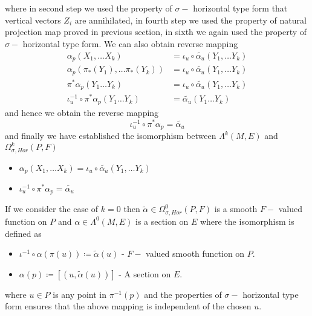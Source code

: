 \documentclass[12pt]{article}
\begin{document}
where in second step we used the property of $\sigma-$ horizontal type form that vertical vectors $Z_{i}$ are annihilated, in fourth step we used the property of natural projection map proved in previous section, in sixth we again used the property of $\sigma-$ horizontal type form. We can also obtain reverse mapping
\begin{align*}
    \alpha_{p}(X_{1}, \dots X_{k}) &=  \iota_{u}\circ\tilde{\alpha_{u}}(Y_{1}, \dots Y_{k}) \\
   \alpha_{p}(\pi_{\ast}(Y_{1}), \dots \pi_{\ast}(Y_{k}))  &= \iota_{u}\circ\tilde{\alpha_{u}}(Y_{1}, \dots Y_{k}) \\
      \pi^{\ast}\alpha_{p}(Y_{1}\dots Y_{k}) &= \iota_{u}\circ\tilde{\alpha_{u}}(Y_{1}, \dots Y_{k}) \\
      \iota_{u}^{-1}\circ\pi^{\ast}\alpha_{p}(Y_{1}\dots Y_{k}) &= \tilde{\alpha_{u}}(Y_{1}\dots Y_{k})
\end{align*} and hence we obtain the reverse mapping
\begin{equation*}
    \iota_{u}^{-1}\circ\pi^{\ast}\alpha_{p} = \tilde{\alpha_{u}}
\end{equation*} and finally we have established the isomorphism between $\Lambda^{k}(M, E)$ and $\Omega^{k}_{\sigma, Hor}(P, F)$
\begin{itemize}
    \item $\alpha_{p}(X_{1}, \dots X_{k}) =  \iota_{u}\circ\tilde{\alpha_{u}}(Y_{1}, \dots Y_{k})$
    \item $\iota_{u}^{-1}\circ\pi^{\ast}\alpha_{p} = \tilde{\alpha_{u}}$
\end{itemize}
If we consider the case of $k = 0$ then $\tilde{\alpha}\in \Omega^{0}_{\sigma, Hor}(P, F)$ is a smooth $F-$ valued function on $P$ and $\alpha\in\Lambda^{0}(M, E)$ is a section on $E$ where the isomorphism is defined as
\begin{itemize}
    \item $\iota^{-1}\circ\alpha(\pi(u)) \coloneqq \tilde{\alpha}(u) $ - $F-$ valued smooth function on $P$.
    \item $\alpha(p) \coloneqq [(u, \tilde{\alpha}(u))]$ - A section on $E$.
\end{itemize} where $u\in P$ is any point in $\pi^{-1}(p)$ and the properties of $\sigma-$ horizontal type form ensures that the above mapping is independent of the chosen $u$.
\end{document}
